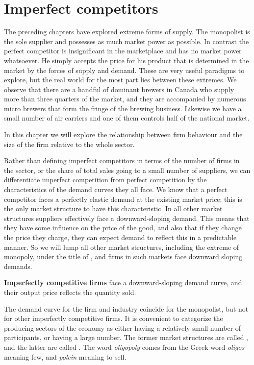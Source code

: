 \section{Imperfect competitors}\label{sec:ch11sec1}

The preceding chapters have explored extreme forms of supply. The monopolist is the sole supplier and possesses as much market power as possible. In contrast the perfect competitor is insignificant in the marketplace and has no market power whatsoever. He simply accepts the price for his product that is determined in the market by the forces of supply and demand. These are very useful paradigms to explore, but the real world for the most part lies between these extremes. We observe that there are a handful of dominant brewers in Canada who supply more than three quarters of the market, and they are accompanied by numerous micro brewers that form the fringe of the brewing business. Likewise we have a small number of air carriers and one of them controls half of the national market. 

In this chapter we will explore the relationship between firm behaviour and the size of the firm relative to the whole sector. 

Rather than defining imperfect competitors in terms of the number of firms in the sector, or the share of total sales going to a small number of suppliers, we can differentiate imperfect competition from perfect competition by the characteristics of the demand curves they all face.  We know that a perfect competitor faces a perfectly elastic demand at the existing market price; this is the only market structure to have this characteristic. In all other market structures suppliers effectively face a downward-sloping demand. This means that they have some influence on the price of the good, and also that if they change the price they charge, they can expect demand to reflect this in a predictable manner. So we will lump all other market structures, including the extreme of monopoly, under the title of , and firms in such markets face downward sloping demands.

\begin{DefBox}
\textbf{Imperfectly competitive firms} face a downward-sloping demand curve, and their output price reflects the quantity sold.
\end{DefBox}

The demand curve for the firm and industry coincide for the monopolist, but not for other imperfectly competitive firms. It is convenient to categorize the producing sectors of the economy as either having a relatively small number of participants, or having a large number. The former market structures are called , and the latter are called . The word \textit{oligopoly} comes from the Greek word \textit{oligos} meaning few, and \textit{polein} meaning to sell.

